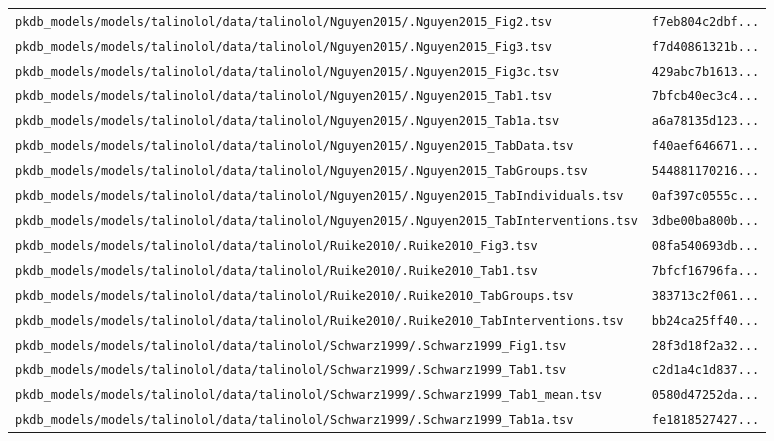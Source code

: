 \documentclass{article}
\begin{document}
\begin{longtable}{ll}
\texttt{pkdb\_models/models/talinolol/data/talinolol/Nguyen2015/.Nguyen2015\_Fig2.tsv} & \texttt{f7eb804c2dbf...} \\
\texttt{pkdb\_models/models/talinolol/data/talinolol/Nguyen2015/.Nguyen2015\_Fig3.tsv} & \texttt{f7d40861321b...} \\
\texttt{pkdb\_models/models/talinolol/data/talinolol/Nguyen2015/.Nguyen2015\_Fig3c.tsv} & \texttt{429abc7b1613...} \\
\texttt{pkdb\_models/models/talinolol/data/talinolol/Nguyen2015/.Nguyen2015\_Tab1.tsv} & \texttt{7bfcb40ec3c4...} \\
\texttt{pkdb\_models/models/talinolol/data/talinolol/Nguyen2015/.Nguyen2015\_Tab1a.tsv} & \texttt{a6a78135d123...} \\
\texttt{pkdb\_models/models/talinolol/data/talinolol/Nguyen2015/.Nguyen2015\_TabData.tsv} & \texttt{f40aef646671...} \\
\texttt{pkdb\_models/models/talinolol/data/talinolol/Nguyen2015/.Nguyen2015\_TabGroups.tsv} & \texttt{544881170216...} \\
\texttt{pkdb\_models/models/talinolol/data/talinolol/Nguyen2015/.Nguyen2015\_TabIndividuals.tsv} & \texttt{0af397c0555c...} \\
\texttt{pkdb\_models/models/talinolol/data/talinolol/Nguyen2015/.Nguyen2015\_TabInterventions.tsv} & \texttt{3dbe00ba800b...} \\
\texttt{pkdb\_models/models/talinolol/data/talinolol/Ruike2010/.Ruike2010\_Fig3.tsv} & \texttt{08fa540693db...} \\
\texttt{pkdb\_models/models/talinolol/data/talinolol/Ruike2010/.Ruike2010\_Tab1.tsv} & \texttt{7bfcf16796fa...} \\
\texttt{pkdb\_models/models/talinolol/data/talinolol/Ruike2010/.Ruike2010\_TabGroups.tsv} & \texttt{383713c2f061...} \\
\texttt{pkdb\_models/models/talinolol/data/talinolol/Ruike2010/.Ruike2010\_TabInterventions.tsv} & \texttt{bb24ca25ff40...} \\
\texttt{pkdb\_models/models/talinolol/data/talinolol/Schwarz1999/.Schwarz1999\_Fig1.tsv} & \texttt{28f3d18f2a32...} \\
\texttt{pkdb\_models/models/talinolol/data/talinolol/Schwarz1999/.Schwarz1999\_Tab1.tsv} & \texttt{c2d1a4c1d837...} \\
\texttt{pkdb\_models/models/talinolol/data/talinolol/Schwarz1999/.Schwarz1999\_Tab1\_mean.tsv} & \texttt{0580d47252da...} \\
\texttt{pkdb\_models/models/talinolol/data/talinolol/Schwarz1999/.Schwarz1999\_Tab1a.tsv} & \texttt{fe1818527427...} \\

\end{longtable}
\end{document}

